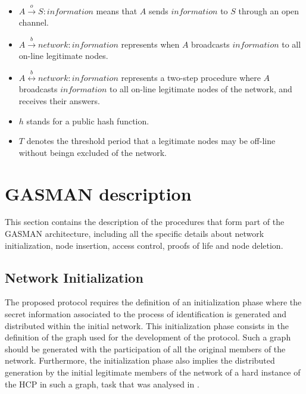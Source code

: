 \documentclass{article}
\begin{document}
\begin{itemize}
\item $A \stackrel{o}{\rightarrow} S: information $  means that $ A $ sends $information$
to $S$ through an open channel.

\item $A \stackrel{b}{\rightarrow} network: information $ represents when $
A $ broadcasts $information$ to all on-line legitimate nodes.

\item $A \stackrel{b}{\leftrightarrow} network:
information $ represents a two-step procedure where $ A $
broadcasts $information$ to all on-line legitimate nodes of the
network, and receives their answers.

\item $h$ stands for a public hash function.

\item $T$ denotes the
threshold period that a legitimate nodes may be off-line without beingn excluded of the network.

\end{itemize}

\section{GASMAN description}
\label{ElementsDescription}
This section contains the description of the procedures that form part of the GASMAN architecture, including all the specific details
about network initialization, node insertion, access control,
proofs of life and node deletion.
\subsection{Network Initialization}

The proposed protocol requires the
definition of an initialization phase where the secret information
associated to the process of identification is generated and
distributed within the initial network. This initialization phase
consists in the definition of the graph used for the development
of the protocol. Such a graph should be generated with the participation of all the original members of the
network. Furthermore, the initialization phase also implies the distributed generation by the initial legitimate members of the network of a hard instance of the HCP in such a graph, task that was analysed in \cite{KWBF03}.
\end{document}
